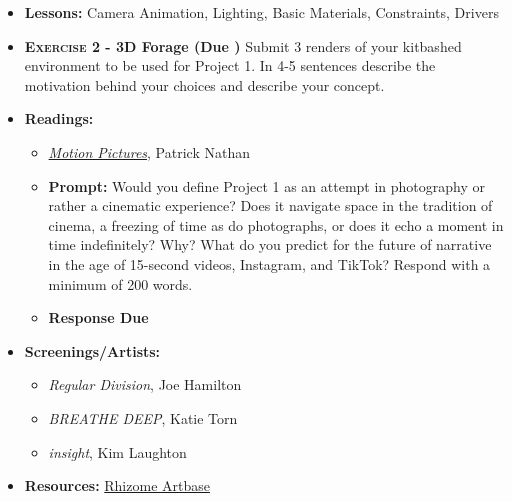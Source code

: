 \begin{itemize}[noitemsep,topsep=0pt,leftmargin=*]
    \item \textbf{Lessons:} Camera Animation, Lighting, Basic Materials, Constraints, Drivers
    \item \textbf{\textsc{Exercise 2} - 3D Forage (Due \tues)} Submit 3 renders of your kitbashed environment to be used for Project 1. In 4-5 sentences describe the motivation behind your choices and describe your concept. 
    \item \textbf{Readings:}
    \begin{itemize}
        \item \href{https://reallifemag.com/motion-pictures/}{\emph{Motion Pictures}}, Patrick Nathan
        \item \textbf{Prompt:} Would you define Project 1 as an attempt in photography or rather a cinematic experience? Does it navigate space in the tradition of cinema, a freezing of time as do photographs, or does it echo a moment in time indefinitely? Why? What do you predict for the future of narrative in the age of 15-second videos, Instagram, and TikTok? Respond with a minimum of 200 words.
        \item \textbf{Response Due \thur}
    \end{itemize}
    \item \textbf{Screenings/Artists:}
    \begin{itemize}
        \item \emph{Regular Division}, Joe Hamilton
        \item \emph{BREATHE DEEP}, Katie Torn
        \item \emph{insight}, Kim Laughton
    \end{itemize}
    \item \textbf{Resources:} \href{https://rhizome.org/art/artbase/}{Rhizome Artbase}
\end{itemize}